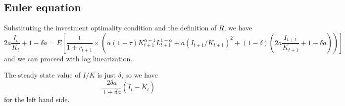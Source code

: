 \documentclass[11pt]{amsart}
\begin{document}
\subsection{Euler equation}

Substituting the investment optimality condition and the definition of $R$, we have
\begin{dmath*}
	2a \frac{I_t}{K_t} + 1 - \delta a = E\left[ \frac{1}{1+r_{t+1}} \times (\alpha (1-\tau) K_{t+1}^{\alpha-1} L_{t+1}^{1-\alpha} + a(I_{t+1} / K_{t+1})^2 + (1-\delta) (2a \frac{I_{t+1}}{K_{t+1}} + 1 - \delta a) )\right]
\end{dmath*}
and we can proceed with log linearization.

The steady state value of $I/K$ is just $\delta$, so we have
\[
\frac{2 \delta a}{1 + \delta a} (\check{I}_t - \check{K}_t)
\]
for the left hand side.
\end{document}
